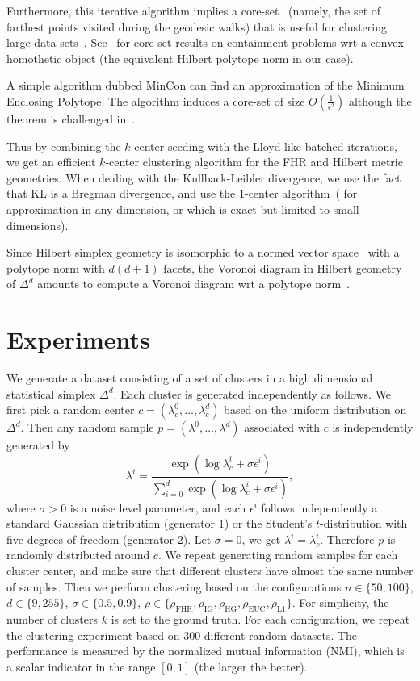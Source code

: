 \documentclass[graybox]{svmult}
\def\eps{\epsilon}
\begin{document}
Furthermore, this iterative algorithm implies a core-set~\cite{coreset-2008} (namely, the set of farthest points visited during the geodesic walks)
that is useful for clustering large data-sets~\cite{coreset-2017}.
See~\cite{Brandenberg-2013} for core-set results on containment problems
wrt a convex homothetic object (the equivalent Hilbert polytope norm in our case).

A simple algorithm dubbed {\sc MinCon} \cite{EnclosingPolytope-2004} 
can find an approximation of the Minimum Enclosing Polytope.
The algorithm induces a core-set of size $O(\frac{1}{\eps^2})$ although the theorem is challenged in~\cite{Brandenberg-2013}.

Thus by combining the $k$-center seeding \cite{kcenter-1985} with the Lloyd-like batched iterations, we get an efficient $k$-center clustering
algorithm for the FHR and Hilbert metric geometries.
When dealing with the Kullback-Leibler divergence, we use the fact that KL is a Bregman divergence, and
use the $1$-center algorithm~(\cite{BregmanMinimax-2005,BregmanBall-2006} for approximation in any dimension,
or \cite{SEBB-2008} which is exact but limited to small dimensions).

Since Hilbert simplex geometry is isomorphic to a normed vector space~\cite{BH-2014} with
a polytope norm with $d(d+1)$ facets, the Voronoi diagram in Hilbert geometry of $\Delta^d$ amounts to 
compute a Voronoi diagram wrt a polytope norm~\cite{MinisumHypersphere-2011,VoronoiNorm-2012,voronoi-2015}.

\section{Experiments}\label{sec:exp}
We generate a dataset consisting of a set of clusters in a high dimensional statistical simplex $\Delta^d$.
Each cluster is generated independently as follows. We first pick a
random center $c=(\lambda_c^0,\ldots,\lambda_c^d)$ based on the uniform distribution on $\Delta^d$.
Then any random sample $p=(\lambda^0,\ldots,\lambda^d)$ associated with $c$ is independently generated by
$$
\lambda^i = \frac{\exp(\log\lambda_c^i + \sigma\epsilon^i)}{\sum_{i=0}^d \exp(\log\lambda_c^i + \sigma\epsilon^i) },
$$
where $\sigma>0$ is a noise level parameter, and each $\epsilon^i$ follows independently
a standard Gaussian distribution (generator 1) or the Student's $t$-distribution
with five degrees of freedom (generator 2).
Let $\sigma=0$, we get $\lambda^i=\lambda_c^i$. Therefore $p$ is randomly distributed around $c$.
We repeat generating random samples for each cluster center, and make sure
that different clusters have almost the same number of samples. Then we 
perform clustering based on the configurations
$n\in\{50,100\}$, $d\in\{9,255\}$, $\sigma\in\{0.5,0.9\}$,
$\rho\in\{\rho_{\mathrm{FHR}}, \rho_{\mathrm{IG}}, \rho_{\mathrm{HG}},
\rho_{\mathrm{EUC}}, \rho_{\mathrm{L1}}\}$.
For simplicity, the number of clusters $k$ is set to the ground truth.
For each
configuration, we repeat the clustering experiment based on 300 different random
datasets. The performance is measured by the normalized mutual information (NMI),
which is a scalar indicator in the range $[0,1]$ (the larger the better).
\end{document}
